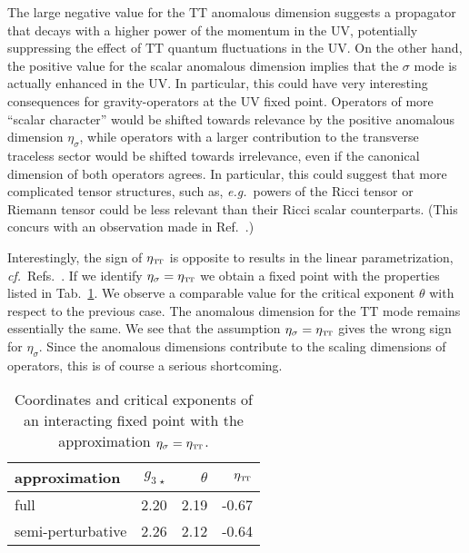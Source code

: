 \documentclass[11pt]{book} %
\newcommand\TTspace{ -1pt }
\newcommand\etaTT{ \eta_{\scriptscriptstyle{\mathrm{T\hspace{\TTspace}T}}} }
\newcommand\eg{\textit{e.g.}\ }
\newcommand\cf{\textit{cf.}\ }
\numberwithin{equation}{chapter}
\begin{document}
The large negative value for the $\mathrm{TT}$ anomalous dimension suggests a propagator that decays with a
higher power of the momentum in the UV, potentially suppressing the effect of $\mathrm{TT}$ quantum
fluctuations in the UV.
On the other hand, the positive value for the scalar anomalous dimension implies that the
$\sigma$ mode is actually enhanced in the UV.
In particular, this could have very interesting consequences for gravity-operators at the UV fixed point.
Operators of more ``scalar character'' would be shifted towards relevance by the positive anomalous
dimension $\eta_{\sigma}$, while operators with a larger contribution to the transverse traceless sector
would be shifted towards irrelevance, even if the canonical dimension of both operators agrees.
In particular, this could suggest that more complicated tensor structures,
such as, \eg powers of the Ricci tensor or Riemann tensor could be less relevant than their
Ricci scalar counterparts.
(This concurs with an observation made in Ref.~\cite{Codello:2006in}.)

Interestingly, the sign of $\etaTT$ is opposite to results in the
linear parametrization, \cf Refs.~\cite{Codello:2013fpa, Dona:2013qba, Christiansen:2014raa}.
If we identify $\eta_{\sigma} = \etaTT$ we obtain a fixed point with the properties
listed in Tab.~\ref{puregravityFPetaapprox}.
We observe a comparable value for the critical exponent $\theta$ with  respect to the previous case.
The anomalous dimension for the $\mathrm{TT}$ mode remains essentially the same.
We see that the assumption $\eta_{\sigma}=\etaTT$ gives the wrong sign for $\eta_\sigma$.
Since the anomalous dimensions contribute to the scaling dimensions of operators,
this is of course a serious shortcoming.

\begin{table}
  \begin{center}
  \begin{tabular}{ l r r r }
    \toprule
    approximation     & $g_{3\,\star}$ & $\theta$ & $\etaTT$ \\
    \midrule
    full              & 2.20          & 2.19     & -0.67 \\
    semi-perturbative & 2.26          & 2.12     & -0.64 \\
    \bottomrule
  \end{tabular}
  \end{center}
  \caption[Coordinates and critical exponents of fixed points]
  {
    Coordinates and critical exponents of an interacting fixed point with the
    approximation $\eta_{\sigma} = \etaTT$.
  }
  \label{puregravityFPetaapprox}
\end{table}
\end{document}

